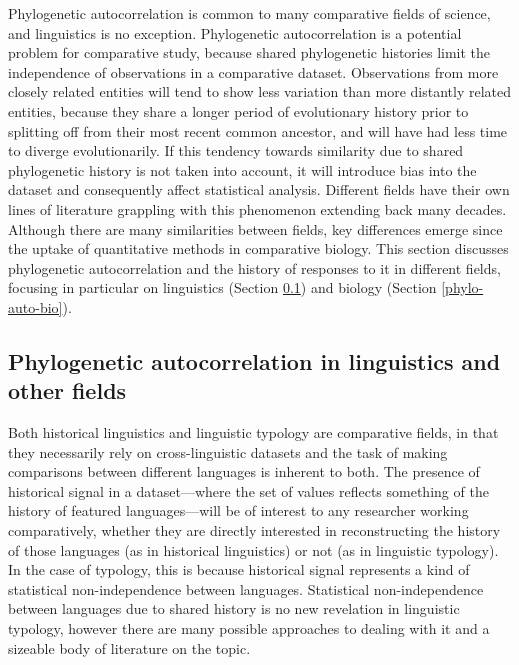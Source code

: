 Phylogenetic autocorrelation is common to many comparative fields of science, and linguistics is no exception. Phylogenetic autocorrelation is a potential problem for comparative study, because shared phylogenetic histories limit the independence of observations in a comparative dataset. Observations from more closely related entities will tend to show less variation than more distantly related entities, because they share a longer period of evolutionary history prior to splitting off from their most recent common ancestor, and will have had less time to diverge evolutionarily. If this tendency towards similarity due to shared phylogenetic history is not taken into account, it will introduce bias into the dataset and consequently affect statistical analysis. Different fields have their own lines of literature grappling with this phenomenon extending back many decades. Although there are many similarities between fields, key differences emerge since the uptake of quantitative methods in comparative biology. This section discusses phylogenetic autocorrelation and the history of responses to it in different fields, focusing in particular on linguistics (Section \ref{phylo-auto-ling}) and biology (Section \ref{phylo-auto-bio}).

\hypertarget{phylo-auto-ling}{%
\subsection{Phylogenetic autocorrelation in linguistics and other fields}\label{phylo-auto-ling}}

Both historical linguistics and linguistic typology are comparative fields, in that they necessarily rely on cross-linguistic datasets and the task of making comparisons between different languages is inherent to both. The presence of historical signal in a dataset---where the set of values reflects something of the history of featured languages---will be of interest to any researcher working comparatively, whether they are directly interested in reconstructing the history of those languages (as in historical linguistics) or not (as in linguistic typology). In the case of typology, this is because historical signal represents a kind of statistical non-independence between languages. Statistical non-independence between languages due to shared history is no new revelation in linguistic typology, however there are many possible approaches to dealing with it and a sizeable body of literature on the topic.

